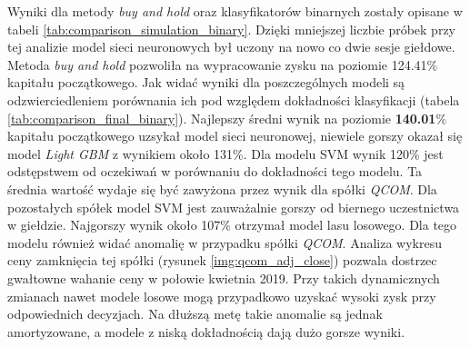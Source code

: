 \documentclass[a4paper, twoside, 11pt, openright]{article}
\begin{document}
\bigskip

Wyniki dla metody \textit{buy and hold} oraz klasyfikatorów binarnych zostały opisane w tabeli \ref{tab:comparison_simulation_binary}. Dzięki mniejszej liczbie próbek przy tej analizie model sieci neuronowych był uczony na nowo co dwie sesje giełdowe. Metoda \textit{buy and hold} pozwoliła na wypracowanie zysku na poziomie 124.41\% kapitału początkowego. Jak widać wyniki dla poszczególnych modeli są odzwierciedleniem porównania ich pod względem dokładności klasyfikacji (tabela \ref{tab:comparison_final_binary}). Najlepszy średni wynik na poziomie \textbf{140.01}\% kapitału początkowego uzsykał model sieci neuronowej, niewiele gorszy okazał się model \textit{Light GBM} z wynikiem około 131\%. Dla modelu SVM wynik 120\% jest odstępstwem od oczekiwań w porównaniu do dokładności tego modelu. Ta średnia wartość wydaje się być zawyżona przez wynik dla spółki \textit{QCOM}. Dla pozostałych spółek model SVM jest zauważalnie gorszy od biernego uczestnictwa w giełdzie. Najgorszy wynik około 107\% otrzymał model lasu losowego. Dla tego modelu również widać anomalię w przypadku spółki \textit{QCOM}. Analiza wykresu ceny zamknięcia tej spółki (rysunek \ref{img:qcom_adj_close}) pozwala dostrzec gwałtowne wahanie ceny w połowie kwietnia 2019. Przy takich dynamicznych zmianach nawet modele losowe mogą przypadkowo uzyskać wysoki zysk przy odpowiednich decyzjach. Na dłuższą metę takie anomalie są jednak amortyzowane, a modele z niską dokładnością dają dużo gorsze wyniki.

\end{document}
